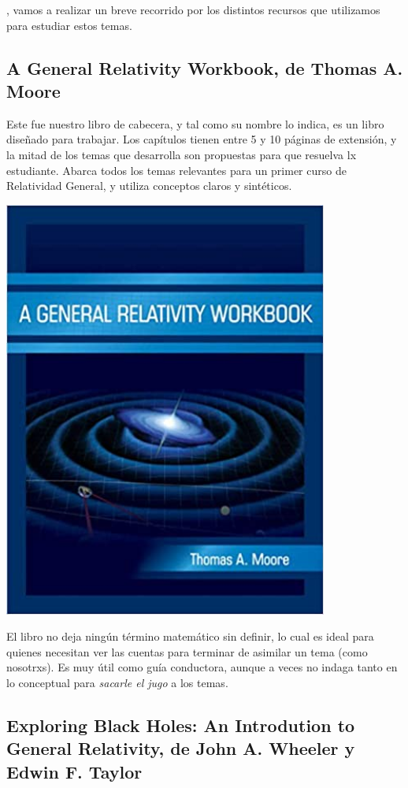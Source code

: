 , vamos a realizar un breve recorrido por los distintos recursos que utilizamos para estudiar estos temas.

\subsection*{\textbf{A General Relativity Workbook}, de Thomas A. Moore}
Este fue nuestro libro de cabecera, y tal como su nombre lo indica, es un libro diseñado para trabajar. Los capítulos tienen entre 5 y 10 páginas de extensión, y la mitad de los temas que desarrolla son propuestas para que resuelva lx estudiante. Abarca todos los temas relevantes para un primer curso de Relatividad General, y utiliza conceptos claros y sintéticos. 
\begin{marginfigure}
\includegraphics[width=0.8\textwidth]{Im/moore.jpg}
\end{marginfigure}

El libro no deja ningún término matemático sin definir, lo cual es ideal para quienes necesitan ver las cuentas para terminar de asimilar un tema (como nosotrxs). Es muy útil como guía conductora, aunque a veces no indaga tanto en lo conceptual para \textit{sacarle el jugo} a los temas.

\subsection*{\textbf{Exploring Black Holes: An Introdution to General Relativity}, de John A. Wheeler y Edwin F. Taylor}

